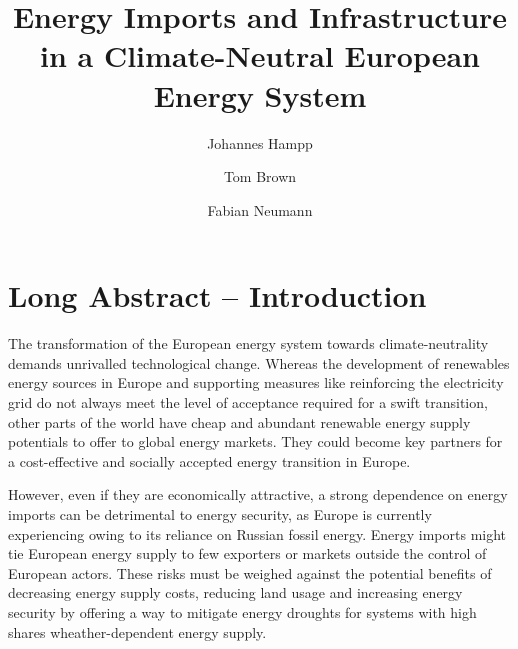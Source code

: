 \documentclass[10pt,5p,reversenotenum,lefttitle]{elsarticle}
\begin{document}
\begin{frontmatter}

	\title{Energy Imports and Infrastructure in a Climate-Neutral European Energy System}
    
	\author[jlu]{Johannes Hampp}
    \author[tub]{Tom Brown}
	\author[tub]{Fabian Neumann}
	\address[jlu]{Center for International Development and Environmental Research, Justus-Liebig-University Gießen, Gießen, Germany}
	\address[tub]{Department of Digital Transformation in Energy Systems, Institute of Energy Technology, Technische Universität Berlin, Fakultät III, Einsteinufer 25 (TA 8), 10587 Berlin, Germany}

\end{frontmatter}

\section*{Long Abstract -- Introduction}

The transformation of the European energy system towards climate-neutrality
demands unrivalled technological change. Whereas the development of renewables
energy sources in Europe and supporting measures like reinforcing the
electricity grid do not always meet the level of acceptance required for a swift
transition, other parts of the world have cheap and abundant renewable energy
supply potentials to offer to global energy
markets.\cite{irenaGlobalHydrogen2022,luxSupplyCurves2021,vanderzwaanTimmermansDream2021,fasihiLongTermHydrocarbon2017,reichenbergDeepDecarbonization2022,galvanExportingSunshine2022,armijoFlexibleProduction2020,pfennigGlobalGISbased2022}
They could become key partners for a cost-effective and socially accepted energy
transition in Europe.

However, even if they are economically attractive, a strong dependence on energy
imports can be detrimental to energy security, as Europe is currently
experiencing owing to its reliance on Russian fossil
energy.\cite{pedersenLongtermImplications2022} Energy imports might tie European
energy supply to few exporters or markets outside the control of European
actors. These risks must be weighed against the potential benefits of decreasing
energy supply costs, reducing land usage and increasing energy security by
offering a way to mitigate energy droughts for systems with high shares
wheather-dependent energy supply.
\end{document}
